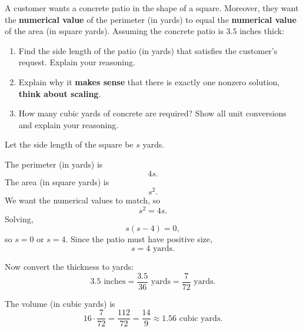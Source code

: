 \documentclass[handout,nooutcomes,noauthor,12pt]{ximera}
\begin{document}
\begin{question}
A customer wants a concrete patio in the shape of a square.
Moreover, they want the  \textbf{numerical value} of the perimeter (in yards) 
to equal the \textbf{numerical value} of the area (in square yards).
Assuming the concrete patio is $3.5$ inches thick:
\begin{enumerate}
\item Find the side length of the patio (in yards) that satisfies the
customer's request. Explain your reasoning.
\item Explain why it \textbf{makes sense} that there is exactly one nonzero solution, \textbf{think about scaling}.
\item How many cubic yards of concrete are required? Show all unit
conversions and explain your reasoning.
\end{enumerate}
\begin{freeResponse}
Let the side length of the square be $s$ yards.

The perimeter (in yards) is
\[
4s.
\]
The area (in square yards) is
\[
s^2.
\]
We want the numerical values to match, so
\[
s^2 = 4s.
\]
Solving,
\[
s(s-4)=0,
\]
so $s=0$ or $s=4$.  Since the patio must have positive size,
\[
s = 4 \text{ yards}.
\]

Now convert the thickness to yards:
\[
3.5 \text{ inches} = \frac{3.5}{36} \text{ yards}
= \frac{7}{72} \text{ yards}.
\]

The volume (in cubic yards) is
\[
16 \cdot \frac{7}{72}
= \frac{112}{72}
= \frac{14}{9}
\approx 1.56 \text{ cubic yards}.
\]
\end{freeResponse}
\end{question}
\mynewpage

\end{document}
